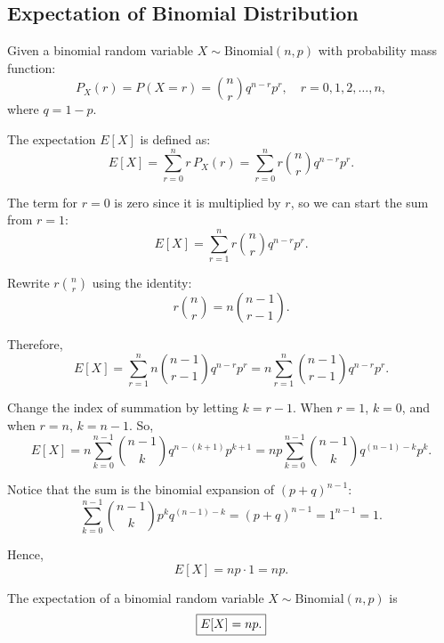 \subsection{Expectation of Binomial Distribution}
\label{ssec:expectation-of-binomial-distribution}

Given a binomial random variable \(X \sim \text{Binomial}(n,
p)\) with probability mass function:
\[
  P_X(r) = P(X = r) = \binom{n}{r} q^{n-r} p^{r}, \quad r =
  0, 1, 2, \ldots, n,
\]
where \( q = 1 - p \).

\bigskip

\begin{definition}
  The expectation \(E[X]\) is defined as:
  \[
    E[X] = \sum_{r=0}^n r \, P_X(r) = \sum_{r=0}^n r
    \binom{n}{r} q^{n-r} p^r.
  \]
\end{definition}

\bigskip

\begin{note}
  The term for \(r=0\) is zero since it is multiplied by
  \(r\), so we can start the sum from \(r=1\):
  \[
    E[X] = \sum_{r=1}^n r \binom{n}{r} q^{n-r} p^r.
  \]
\end{note}

\bigskip

Rewrite \(r \binom{n}{r}\) using the identity:
\[
  r \binom{n}{r} = n \binom{n-1}{r-1}.
\]

Therefore,
\[
  E[X] = \sum_{r=1}^n n \binom{n-1}{r-1} q^{n-r} p^r = n \sum_{r=1}^n \binom{n-1}{r-1} q^{n-r} p^r.
\]

\bigskip

Change the index of summation by letting \(k = r - 1\). When
\(r=1\), \(k=0\), and when \(r=n\), \(k=n-1\). So,
\[
  E[X] = n \sum_{k=0}^{n-1} \binom{n-1}{k} q^{n - (k+1)}
  p^{k+1} = n p \sum_{k=0}^{n-1} \binom{n-1}{k} q^{(n-1)-k}
  p^k.
\]

\bigskip

Notice that the sum is the binomial expansion of \((p +
q)^{n-1}\):
\[
  \sum_{k=0}^{n-1} \binom{n-1}{k} p^k q^{(n-1)-k} = (p + q)^{n-1} = 1^{n-1} = 1.
\]

\bigskip

Hence,
\[
  E[X] = n p \cdot 1 = n p.
\]

\bigskip

\begin{remark}
  The expectation of a binomial random variable \(X \sim \text{Binomial}(n,p)\) is
  \begin{equation}
    \label{eqn:expectation-of-binomial-distribution}
    \begin{displaystyle}
      \boxed{E[X] = n p.}
    \end{displaystyle}
  \end{equation}
\end{remark}

